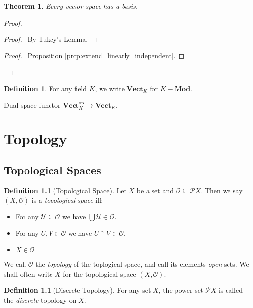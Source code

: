 \documentclass{book}
\let\qed\relax
\newtheorem{thm}[ax]{Theorem}
\theoremstyle{definition}
\newtheorem{df}[ax]{Definition}
\newcommand{\spn}{\ensuremath{\operatorname{span}}}
\begin{document}
\begin{thm}
Every vector space has a basis.
\end{thm}

\begin{proof}
\pf
{}
\begin{proof}
	\pf\ By Tukey's Lemma.
\end{proof}
\step{3}{$\spn \mathcal{B} = V$}
\begin{proof}
	\pf\ Proposition \ref{prop:extend_linearly_independent}.
\end{proof}
\qed
\end{proof}

\begin{df}
For any field $K$, we write $\mathbf{Vect}_K$ for $K-\mathbf{Mod}$.
\end{df}

Dual space functor $\mathbf{Vect}_K^{\mathrm{op}} \rightarrow \mathbf{Vect}_K$.

\chapter{Topology}

\section{Topological Spaces}

\begin{df}[Topological Space]
Let $X$ be a set and $\mathcal{O} \subseteq \mathcal{P} X$. Then we say $(X, \mathcal{O})$ is a \emph{topological space} iff:
\begin{itemize}
\item For any $\mathcal{U} \subseteq \mathcal{O}$ we have $\bigcup \mathcal{U} \in \mathcal{O}$.
\item For any $U, V \in \mathcal{O}$ we have $U \cap V \in \mathcal{O}$.
\item $X \in \mathcal{O}$
\end{itemize}
We call $\mathcal{O}$ the \emph{topology} of the toplogical space, and call its elements \emph{open} sets. We shall often write $X$ for the topological space $(X, \mathcal{O})$.
\end{df}

\begin{df}[Discrete Topology]
For any set $X$, the power set $\mathcal{P} X$ is called the \emph{discrete} topology on $X$.
\end{df}
\end{document}
